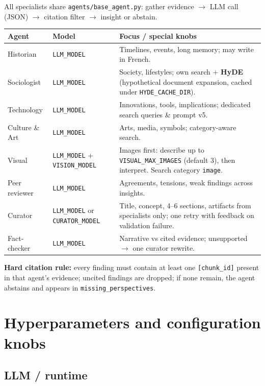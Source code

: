 \documentclass[11pt,a4paper]{article}
\begin{document}
All specialists share \texttt{agents/base\_agent.py}: gather evidence $\rightarrow$
LLM call (JSON) $\rightarrow$ citation filter $\rightarrow$ insight or abstain.

\begin{longtable}{@{}p{2.6cm}p{3.4cm}p{8.5cm}@{}}
\toprule
\textbf{Agent} & \textbf{Model} & \textbf{Focus / special knobs} \\
\midrule
\endhead
Historian & \texttt{LLM\_MODEL} & Timelines, events, long memory; may write in French. \\
Sociologist & \texttt{LLM\_MODEL} & Society, lifestyles; own search + \textbf{HyDE} (hypothetical document expansion, cached under \texttt{HYDE\_CACHE\_DIR}). \\
Technology & \texttt{LLM\_MODEL} & Innovations, tools, implications; dedicated search queries \& prompt v5. \\
Culture \& Art & \texttt{LLM\_MODEL} & Arts, media, symbols; category-aware search. \\
Visual & \texttt{LLM\_MODEL} + \texttt{VISION\_MODEL} & Images first: describe up to \texttt{VISUAL\_MAX\_IMAGES} (default 3), then interpret. Search category \texttt{image}. \\
Peer reviewer & \texttt{LLM\_MODEL} & Agreements, tensions, weak findings across insights. \\
Curator & \texttt{LLM\_MODEL} or \texttt{CURATOR\_MODEL} & Title, concept, 4--6 sections, artifacts from specialists only; one retry with feedback on validation failure. \\
Fact-checker & \texttt{LLM\_MODEL} & Narrative vs cited evidence; unsupported $\rightarrow$ one curator rewrite. \\
\bottomrule
\end{longtable}

\noindent\textbf{Hard citation rule:} every finding must contain at least one
\texttt{[chunk\_id]} present in that agent's evidence; uncited findings are
dropped; if none remain, the agent abstains and appears in
\texttt{missing\_perspectives}.

\section{Hyperparameters and configuration knobs}

\subsection{LLM / runtime}
\end{document}

